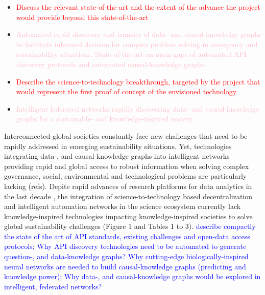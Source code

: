 \documentclass[12pt, a4paper]{article} %
\begin{document}
\begin{itemize}
\item \textcolor{red}{Discuss the relevant state-of-the-art and the
    extent of the advance the project would provide beyond this
    state-of-the-art}
\item \textcolor{pink}{Automated rapid discovery and transfer of data-
    and causal-knowledge graphs to facilitate informed decision for
    complex problem solving in emergency and sustainability
    situations. State-of-the-art an main gaps of automated API
    discovery protocols and automated causal-knowledge graphs}
\item \textcolor{red}{Describe the science-to-technology breakthrough,
    targeted by the project that would represent the first proof of
    concept of the envisioned technology}
\item \textcolor{pink}{Intelligent federated networks rapidly
    discovering data- and causal-knowledge graphs for a sustainable-
    and knowledge-inspired society.}
\end{itemize}

Interconnected global societies constantly face new challenges that
need to be rapidly addressed in emerging sustainability
situations. Yet, technologies integrating data-, and causal-knowledge
graphs into intelligent networks providing rapid and global access to
robust information when solving complex governance, social,
environmental and technological problems are particularly lacking
(refs). Depite rapid advances of research platforms for data analytics
in the last decade
\citep{Melniketal:2010,Steinruecken,Modulos,Guimera2020,GoogleAI,IrisAI,easeml,datarobot,aito},
the integration of science-to-technology based decentralization and
intelligent automation networks in the science ecosystem currently
lack knowledge-inspired technologies impacting knowledge-inspired
societies to solve global sustainability challenges (Figure 1 and
Tables 1 to 3). \textcolor{blue}{describe compactly the state of the
  art of API standards, existing challenges and open-data access
  protocols; Why API discovery technologies need to be automated to
  generate question-, and data-knowledge graphs? Why cutting-edge
  biologically-inspired neural networks are needed to build
  causal-knowledge graphs (predicting and knowledge power); Why data-,
  and causal-knowledge graphs would be explored in intelligent,
  federated networks?}
\end{document}
